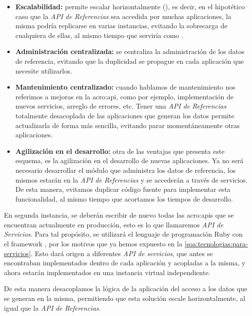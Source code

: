 \begin{itemize}
  \item \textbf{Escalabilidad:} permite escalar horizontalmente (), es decir, en el hipotético caso que la \textit{API de Referencias} sea accedida por muchas aplicaciones, la misma podría replicarse en varias instancias, evitando la sobrecarga de cualquiera de ellas, al mismo tiempo que serviría como .

  \item \textbf{Administración centralizada:} se centraliza la administración de los datos de referencia, evitando que la duplicidad se propague en cada aplicación que necesite utilizarlos.

  \item \textbf{Mantenimiento centralizado:} cuando hablamos de mantenimiento nos referimos a mejoras en la \gls{acro:api}, como por ejemplo, implementación de nuevos servicios, arreglo de errores, etc. Tener una \textit{API de Referencias} totalmente desacoplada de las aplicaciones que generan los datos permite actualizarla de forma más sencilla, evitando parar momentáneamente otras aplicaciones.

  \item \textbf{Agilización en el desarrollo:} otra de las ventajas que presenta este esquema, es la agilización en el desarrollo de nuevas aplicaciones. Ya no será necesario desarrollar el módulo que administra los datos de referencia, los mismos estarán en la \textit{API de Referencias} y se accederán a través de servicios.  De esta manera, evitamos duplicar código fuente para implementar esta funcionalidad, al mismo tiempo que acortamos los tiempos de desarrollo.
\end{itemize}

En segunda instancia, se deberán escribir de nuevo todas las \glspl{acro:api} que se encuentran actualmente en producción, esto es lo que llamaremos \textit{API de Servicios}. Para tal propósito, se utilizará el lenguaje de programación Ruby con el framework , por los motivos que ya hemos expuesto en la \autoref{soa:tecnologias:para-servicios}. Esto dará origen a diferentes \textit{API de servicios}, que antes se encontraban implementados dentro de cada aplicación y acopladas a la misma, y ahora estarán implementados en una instancia virtual independiente.

De esta manera desacoplamos la lógica de la aplicación del acceso a los datos que se generan en la misma, permitiendo que esta solución escale horizontalmente, al igual que la \textit{API de Referencias}.

